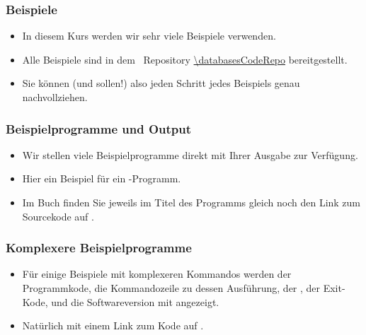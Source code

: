 \documentclass[aspectratio=169,mathserif,notheorems]{beamer}%
\begin{document}
\begin{frame}%
\frametitle{Beispiele}%
\begin{itemize}%
\item In diesem Kurs werden wir sehr viele Beispiele verwenden.%
\item<7-> Alle Beispiele sind in dem \github~Repository \expandafter\url{\databasesCodeRepo} bereitgestellt.%
\item<8-> Sie können (und sollen!) also jeden Schritt jedes Beispiels genau nachvollziehen.%
\end{itemize}%
\end{frame}%
%
\begin{frame}[fragile,t]
\frametitle{Beispielprogramme und Output}%
\begin{itemize}%
\item Wir stellen viele Beispielprogramme direkt mit Ihrer Ausgabe zur Verfügung. %
\item<2-> Hier ein Beispiel für ein \python-Programm.%
\item<4-> Im Buch finden Sie jeweils im Titel des Programms gleich noch den Link zum Sourcekode auf \github.%
\end{itemize}%
%
%
%
\end{frame}
%
\begin{frame}%
\frametitle{Komplexere Beispielprogramme}%
\parbox{0.435\linewidth}{%
\begin{itemize}%
\item Für einige Beispiele mit komplexeren Kommandos werden der Programmkode, die Kommandozeile zu dessen Ausführung, der , der Exit-Kode, und die Softwareversion mit angezeigt.%
\item<2-> Natürlich mit einem Link zum Kode auf \github.%
\end{itemize}%
}%
%
\end{frame}%
\end{document}
